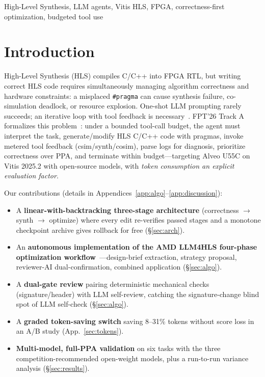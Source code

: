 \documentclass[10pt,conference,letterpaper]{IEEEtran}
\begin{document}
\begin{IEEEkeywords}
High-Level Synthesis, LLM agents, Vitis HLS, FPGA, correctness-first optimization, budgeted tool use
\end{IEEEkeywords}

\section{Introduction}

High-Level Synthesis (HLS) compiles C/C++ into FPGA RTL, but writing correct HLS code requires simultaneously managing algorithm correctness and hardware constraints: a misplaced \texttt{\#pragma} can cause synthesis failure, co-simulation deadlock, or resource explosion. One-shot LLM prompting rarely succeeds; an iterative loop with tool feedback is necessary~\cite{react,autochip,hlsrepair}. FPT'26 Track A formalizes this problem~\cite{fpt26rules}: under a bounded tool-call budget, the agent must interpret the task, generate/modify HLS C/C++ code with pragmas, invoke metered tool feedback (csim/synth/cosim), parse logs for diagnosis, prioritize correctness over PPA, and terminate within budget---targeting Alveo U55C on Vitis 2025.2 with open-source models, with \emph{token consumption an explicit evaluation factor}.

Our contributions (details in Appendices~\ref{app:algo}--\ref{app:discussion}):
\begin{itemize}
    \item A \textbf{linear-with-backtracking three-stage architecture} (correctness $\rightarrow$ synth $\rightarrow$ optimize) where every edit re-verifies passed stages and a monotone checkpoint archive gives rollback for free (\S\ref{sec:arch}).
    \item An \textbf{autonomous implementation of the AMD LLM4HLS four-phase optimization workflow}~\cite{amdllm4hls}---design-brief extraction, strategy proposal, reviewer-AI dual-confirmation, combined application (\S\ref{sec:algo}).
    \item A \textbf{dual-gate review} pairing deterministic mechanical checks (signature/header) with LLM self-review, catching the signature-change blind spot of LLM self-check (\S\ref{sec:algo}).
    \item A \textbf{graded token-saving switch} saving 8--31\% tokens without score loss in an A/B study (App.~\ref{sec:tokens}).
    \item \textbf{Multi-model, full-PPA validation} on six tasks with the three competition-recommended open-weight models, plus a run-to-run variance analysis (\S\ref{sec:results}).
\end{itemize}
\end{document}
